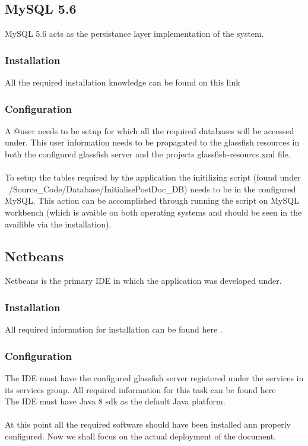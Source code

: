 \documentclass[12pt]{article}
\begin{document}
\subsection{MySQL 5.6}
MySQL 5.6 acts as the persistance layer implementation of the system.
\subsubsection{Installation}
All the required installation knowledge can be found on this link \textbf{}
\subsubsection{Configuration}
A @user needs to be setup for which all the required databases will be accessed under. This user information needs to be propagated to the glassfish resources in both the configured glassfish server and the projects glassfish-resourcs.xml file.
\\
\\
To setup the tables required by the application the initilizing script (found under ~/Source\_Code/Database/InitialisePostDoc\_DB) needs to be in the configured MySQL. This action can be accomplished through running the script on MySQL workbench (which is avaible on both operating systems and should be seen in the availible via the installation).
\subsection{Netbeans}
Netbeans is the primary IDE in which the application was developed under.
\subsubsection{Installation}
All required information for installation can be found here \textbf{}.
\subsubsection{Configuration}
The IDE must have the configured glassfish server registered under the services in its services group. All required information for this task can be found here \textbf{}
\\
The IDE must have Java 8 sdk as the default Java platform.\\
\\
At this point all the required software should have been installed ann properly configured. Now we shall focus on the actual deployment of the document.
\end{document}
